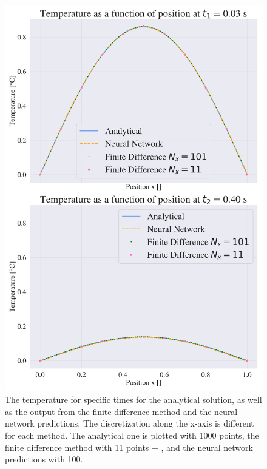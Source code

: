 \begin{figure}[h!]
    \centering
    \includegraphics[width=1.0\linewidth]{project_3/plots/time_slices_comparison.pdf}
    \caption{The temperature for specific times for the analytical solution, as well as the output from the finite difference method and the neural network predictions. The discretization along the x-axis is different for each method. The analytical one is plotted with 1000 points, the finite difference method with 11 points + \mia{}, and the neural network predictions with 100. }
    \label{fig:timeslices}
\end{figure}


